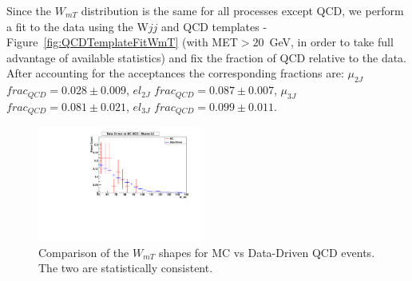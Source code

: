 Since the
$W_{mT}$ distribution is the same for all processes except
QCD, we perform a fit to the data using the W$jj$ and QCD
templates - Figure~\ref{fig:QCDTemplateFitWmT} (with MET$>20$~GeV, in order to
take full advantage of available statistics) and fix the fraction of
QCD relative to the data. 
After accounting for the acceptances the corresponding fractions are: 
$\mu_{2J}$ $frac_{QCD}=0.028\pm 0.009$, $el_{2J}$ $frac_{QCD}=0.087\pm 0.007$, $\mu_{3J}$ $frac_{QCD}=0.081\pm 0.021$, $el_{3J}$ $frac_{QCD}=0.099\pm 0.011$.
\begin{figure}[h!] {\centering
{}\linewidth
\includegraphics[width=0.48\textwidth]{figs/QCDDataVSMC_Muons2J.pdf}
\caption{ Comparison of the $W_{mT}$ shapes for MC vs Data-Driven QCD events. The two are statistically consistent.} 
\label{fig:QCDCutLooseningWmT}}
\end{figure}
